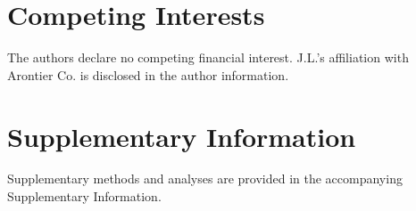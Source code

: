 \documentclass{article}
\begin{document}
\section*{Competing Interests}

The authors declare no competing financial interest. J.L.'s affiliation with Arontier Co. is disclosed in the author information.

\section*{Supplementary Information}

Supplementary methods and analyses are provided in the accompanying Supplementary Information.



\end{document}
